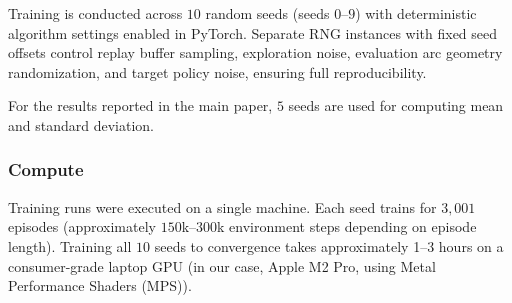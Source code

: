 Training is conducted across $10$ random seeds (seeds $0$--$9$) with deterministic algorithm settings enabled in PyTorch.
Separate RNG instances with fixed seed offsets control replay buffer sampling, exploration noise, evaluation arc geometry randomization, and target policy noise, ensuring full reproducibility.

For the results reported in the main paper, $5$ seeds are used for computing mean and standard deviation.

\subsubsection{Compute}

Training runs were executed on a single machine. Each seed trains for $3{,}001$ episodes (approximately $150$k--$300$k environment steps depending on episode length).
Training all $10$ seeds to convergence takes approximately 1--3 hours on a consumer-grade laptop GPU (in our case, Apple M2 Pro, using Metal Performance Shaders (MPS)).
